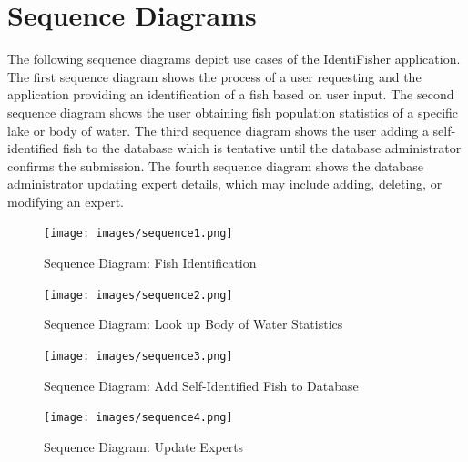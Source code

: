 \documentclass[]{article}
\begin{document}
\section{Sequence Diagrams}
\label{sec:sequence_diagrams}
The following sequence diagrams depict use cases of the IdentiFisher application. The first sequence diagram shows the process of a user requesting and the application providing an identification of a fish based on user input. The second sequence diagram shows the user obtaining fish population statistics of a specific lake or body of water. The third sequence diagram shows the user adding a self-identified fish to the database which is tentative until the database administrator confirms the submission. The fourth sequence diagram shows the database administrator updating expert details, which may include adding, deleting, or modifying an expert.
\begin{figure}[H]
	\texttt{[image: images/sequence1.png]}
	\caption{Sequence Diagram: Fish Identification}
\end{figure}
\begin{figure}[H]
	\texttt{[image: images/sequence2.png]}
	\caption{Sequence Diagram: Look up Body of Water Statistics}
\end{figure}
\begin{figure}[H]
	\texttt{[image: images/sequence3.png]}
	\caption{Sequence Diagram: Add Self-Identified Fish to Database}
\end{figure}
\begin{figure}[H]
	\texttt{[image: images/sequence4.png]}
	\caption{Sequence Diagram: Update Experts}
\end{figure}
\end{document}
